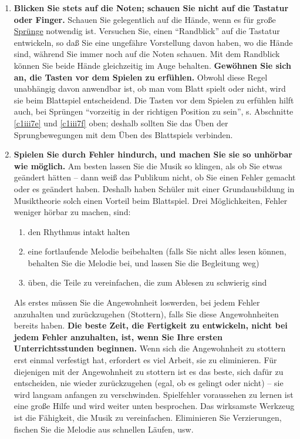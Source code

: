 \begin{enumerate}[label={\arabic*.}] 
\item \textbf{Blicken Sie stets auf die Noten; schauen Sie nicht auf die Tastatur oder Finger.}
Schauen Sie gelegentlich auf die Hände, wenn es für große \hyperref[c1iii7f]{Sprünge} notwendig ist.
Versuchen Sie, einen \enquote{Randblick} auf die Tastatur entwickeln, so daß Sie eine ungefähre Vorstellung davon haben, wo die Hände sind, während Sie immer noch auf die Noten schauen.
Mit dem Randblick können Sie beide Hände gleichzeitig im Auge behalten.
\textbf{Gewöhnen Sie sich an, die Tasten vor dem Spielen zu erfühlen.}
Obwohl diese Regel unabhängig davon anwendbar ist, ob man vom Blatt spielt oder nicht, wird sie beim Blattspiel entscheidend.
Die Tasten vor dem Spielen zu erfühlen hilft auch, bei Sprüngen \enquote{vorzeitig in der richtigen Position zu sein}, s. Abschnitte \hyperref[c1iii7e]{\autoref{c1iii7e}} und \hyperref[c1iii7f]{\autoref{c1iii7f}} oben; deshalb sollten Sie das Üben der Sprungbewegungen mit dem Üben des Blattspiels verbinden.

\item \textbf{Spielen Sie durch Fehler hindurch, und machen Sie sie so unhörbar wie möglich.}
Am besten lassen Sie die Musik so klingen, als ob Sie etwas geändert hätten -- dann weiß das Publikum nicht, ob Sie einen Fehler gemacht oder es geändert haben.
Deshalb haben Schüler mit einer Grundausbildung in Musiktheorie solch einen Vorteil beim Blattspiel.
Drei Möglichkeiten, Fehler weniger hörbar zu machen, sind:

\begin{enumerate}[label={\roman*.}] 
\item den Rhythmus intakt halten
\item eine fortlaufende Melodie beibehalten (falls Sie nicht alles lesen können, behalten Sie die Melodie bei, und lassen Sie die Begleitung weg)
\item üben, die Teile zu vereinfachen, die zum Ablesen zu schwierig sind
\end{enumerate}

Als erstes müssen Sie die Angewohnheit loswerden, bei jedem Fehler anzuhalten und zurückzugehen (Stottern), falls Sie diese Angewohnheiten bereits haben.
\textbf{Die beste Zeit, die Fertigkeit zu entwickeln, nicht bei jedem Fehler anzuhalten, ist, wenn Sie Ihre ersten Unterrichtsstunden beginnen.}
Wenn sich die Angewohnheit zu stottern erst einmal verfestigt hat, erfordert es viel Arbeit, sie zu eliminieren.
Für diejenigen mit der Angewohnheit zu stottern ist es das beste, sich dafür zu entscheiden, nie wieder zurückzugehen (egal, ob es gelingt oder nicht) -- sie wird langsam anfangen zu verschwinden.
Spielfehler voraussehen zu lernen ist eine große Hilfe und wird weiter unten besprochen.
Das wirksamste Werkzeug ist die Fähigkeit, die Musik zu vereinfachen.
Eliminieren Sie Verzierungen, fischen Sie die Melodie aus schnellen Läufen, usw.


\end{enumerate}
